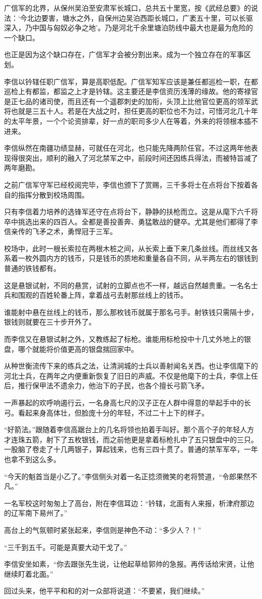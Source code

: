 广信军的北界，从保州吴泊至安肃军长城口，总共五十里宽，按《武经总要》的说法：‘今北边要害，塘水之外，自保州边吴泊西距长城口，广袤五十里，可以长驱深入，乃中国与匈奴必争之地’。乃是河北千余里塘泊防线中最大也是最为危险的一个缺口。

也正是因为这个缺口存在，广信军才会被分割出来。成为一个独立存在的军事区划。

李信以钤辖任职广信军，算是高职低配。广信军知军应该是兼任都巡检一职，在都巡检上有都监，都监之上才是钤辖。这主要还是李信资历浅薄的缘故。他的寄禄官是正七品的诸司使，而且还有一个遥郡刺史的加衔，头顶上比他官位更高的领军武将也就是三五十人。若是在大战之时，担任更高的职位也不为过，可惜河北几十年的太平年景，一个个论资排辈，好一点的职司多少人在等着，外来的将领根本插不进来。

李信纵然在南疆功绩显赫，可就任在河北，也只能先降两阶任官。不过这两年他表现得很突出，顺利的融入了河北禁军之中，前段时间还因练兵得法，而被特旨减了两年磨勘。

之前广信军守军已经校阅完毕，李信也颁下了赏赐，三千多将士在点将台下按着各自的指挥分散到校场周围。

只有李信着力培养的选锋军还守在点将台下，静静的扶枪而立。这是从麾下六千将卒中挑选出来的四百人。全都是善投善奔、勇猛敢战的健卒。尤其是他们都得了李信亲传的飞矛之术，勇悍冠于三军。

校场中，此时一根长索拉在两根木桩之间，从长索上垂下来几条丝线。而丝线又各系着一枚外圆内方的钱币，只是钱币的质地和重量各自不同，从半两左右的银钱到普通的铁钱都有。

这是悬银试射，不同的悬赏，试射的立脚点也不一样，越远自然越贵重。一名名士兵和围观的百姓轮番上阵，拿着战弓去射那丝线上的钱币。

谁能射中悬在丝线上的钱币，那么那枚钱币就属于那名弓手。射铁钱只需隔十步，银钱则就要在三十步开外了。

而李信又在悬银试射之外，又教练起了标枪。谁能用标枪投中十几丈外地上的银盘，哪个就能将价值更高的银盘揣回家中。

从种世衡流传下来的练兵之法，让清涧城的士兵以善射闻名关西。也让李信麾下的河北士兵，在两年之内便重新恢复了旧日的声威。不仅是他麾下的士兵，李信上任后，推行保甲法不遗余力，他治下的子民，也各个擅长弓箭飞矛。

一声暴起的欢呼响遏行云，一名身高七尺的汉子正在人群中得意的举起手中的长弓。看起来身高体壮，但脸庞十分的年轻，不过二十上下的样子。

“好箭法。”跟随着李信高踞台上的几名将领也拍着手叫好。那个高个子的年轻人方才连珠五箭，射下了五枚银钱，而之前他更是拿着标枪扎中了五只银盘中的三只。一股脑了卷走了十几两银子，算起钱来，也有三四十贯了。普通的禁军军卒，一年也拿不到这么多。

“今天的魁首当是小乙了。”李信侧头对着一名正捻须微笑的老将赞道，“令郎果然不凡。”

一名军校这时匆匆上了高台，附在李信耳边：“钤辖，北面有人来报，析津府那边的辽军南下易州了。”

高台上的气氛顿时紧张起来，李信则是神色不动：“多少人？！”

“三千到五千。可能是真要大动干戈了。”

李信安坐如素，“你去跟张先生说，让他起草给郭帅的急报。再传话给宋贤，让他继续盯着北面。”

回过头来，他平平和和的对一众部将说道：“不要紧，我们继续。”

